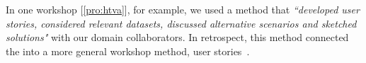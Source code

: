 In one workshop [\ref{pro:htva}], for example, we used a method that {\it ``developed user stories, considered relevant datasets, discussed alternative scenarios and sketched solutions"} with our domain collaborators. In retrospect, this method connected the \topic into a more general workshop method, user stories~\cite{Kumar2012}.





